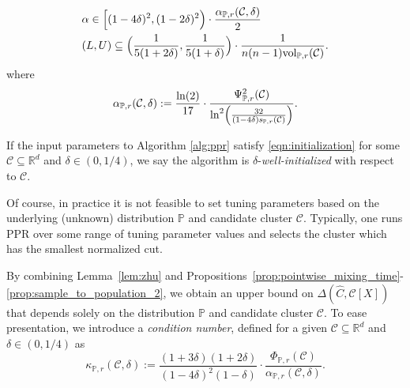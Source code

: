 \documentclass[11pt,twoside]{article}
\newcommand{\Reals}{\mathbb{R}}
\newcommand{\1}{\mathbf{1}}
\newcommand{\Rd}{\Reals^d}
\newcommand{\mc}[1]{\mathcal{#1}}
\newcommand{\Pbb}{\mathbb{P}}
\newcommand{\wh}[1]{\widehat{#1}}
\newcommand{\vol}{\mathrm{vol}}
\begin{document}
\begin{equation}
\label{eqn:initialization}
\begin{aligned}
& \alpha \in \Bigl[(1 - 4\delta)^2, (1 - 2\delta)^2\Bigr) \cdot
 \frac{\alpha_{\Pbb,r}(\mc{C},\delta)}{2} \\
& (L,U) \subseteq \Bigl(\frac{1}{5(1 + 2\delta)},\frac{1}{5(1 + \delta)}\Bigr) \cdot 
\frac{1}{n(n - 1)\vol_{\Pbb,r}(\mc{C})}.
\end{aligned}  
\end{equation}
where
\begin{equation}
\label{eqn:alpha_initialization}
\alpha_{\Pbb,r}(\mc{C},\delta) := \frac{\ln(2)}{17} \cdot \frac{\Psi_{\Pbb,r}^2(\mc{C})}{\ln^2\Bigl(\frac{32}{(1 - 4\delta)s_{\Pbb,r}(\mc{C})}\Bigr)}.
\end{equation}

\begin{definition}
	If the input parameters to Algorithm \ref{alg:ppr} satisfy \eqref{eqn:initialization} for some $\mc{C} \subseteq \Rd$ and $\delta \in (0,1/4)$, we say the algorithm is $\delta$-\emph{well-initialized} with respect to $\mc{C}$.
\end{definition}

Of course, in practice it is not feasible to set tuning parameters based on the 
underlying (unknown) distribution $\Pbb$ and candidate cluster $\mc{C}$. Typically, one runs PPR over some range of
tuning parameter values and selects the cluster which has the smallest
normalized cut. 

By combining Lemma~\ref{lem:zhu} and Propositions~\ref{prop:pointwise_mixing_time}-\ref{prop:sample_to_population_2}, we obtain an upper bound on $\Delta(\wh{C},\mc{C}[X])$ that depends solely on the distribution $\Pbb$ and candidate cluster $\mc{C}$. To ease presentation, we introduce a \emph{condition number}, defined for a given $\mc{C} \subseteq \Rd$ and $\delta \in (0,1/4)$ as
\begin{equation}
\label{eqn:condition_number}
\kappa_{\Pbb,r}(\mc{C},\delta) := \frac{(1 + 3\delta)(1+2\delta)}{(1 - 4\delta)^2(1 - \delta)} \cdot \frac{\Phi_{\Pbb,r}(\mc{C})}{\alpha_{\Pbb,r}(\mc{C},\delta)}.
\end{equation}
\end{document}
